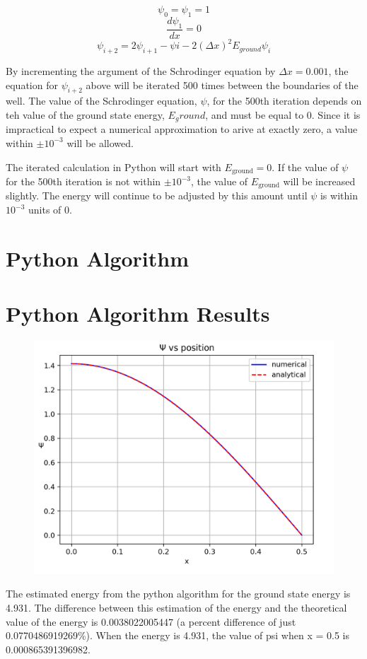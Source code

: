 \documentclass{article}
\begin{document}
$$\psi_0 = \psi_1 = 1$$
$$\frac{d \psi_1}{dx} = 0$$
$$\psi_{i+2} = 2 \psi_{i+1} - \psi{i} - 2\left(\Delta x\right)^2 E_{ground}\psi_i$$

By incrementing the argument of the Schrodinger equation by $\Delta x = 0.001$, the equation for $\psi_{i+2}$ above will be iterated 500 times between the boundaries of the well. The value of the Schrodinger equation, $\psi$, for the 500th iteration depends on teh value of the ground state energy, $E_ground$, and must be equal to 0. Since it is impractical to expect a numerical approximation to arive at exactly zero, a value within $\pm 10^{-3}$ will be allowed. 

The iterated calculation in Python will start with $E_{\text{ground}} = 0$. If the value of $\psi$ for the 500th iteration is not within $\pm 10^{-3}$, the value of $E_{\text{ground}}$ will be increased slightly. The energy will continue to be adjusted by this amount until $\psi$ is within $10^{-3}$ units of 0.

\section{Python Algorithm}


\section{Python Algorithm Results}
\begin{figure}[!h]
	\centering
	\includegraphics[scale=1.0]{results}
\end{figure}
 The estimated energy from the python algorithm for the ground state energy is 4.931. The difference between this estimation of the energy and  the theoretical value of the energy is 0.0038022005447 (a percent difference of just 0.0770486919269\%). When the energy is 4.931, the value of psi when x = 0.5  is 0.000865391396982.
\end{document}
